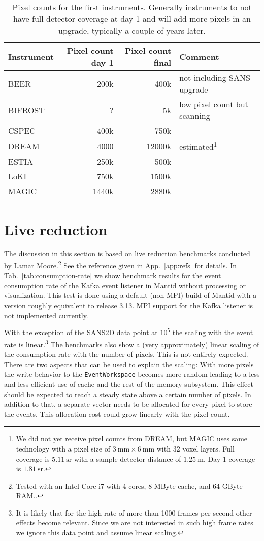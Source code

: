 \documentclass[a4paper,english,numbers=noenddot,bibliography=totoc,chapterprefix=on,DIV=12]{scrartcl}
\newcommand{\beer}{BEER\xspace}
\newcommand{\bifrost}{BIFROST\xspace}
\newcommand{\cspec}{CSPEC\xspace}
\newcommand{\dream}{DREAM\xspace}
\newcommand{\estia}{ESTIA\xspace}
\newcommand{\loki}{LoKI\xspace}
\newcommand{\magic}{MAGIC\xspace}
\newcommand{\mantid}{Mantid\xspace}
\begin{document}
\begin{table}
  \centering
  \begin{tabular}{lrrl}
    Instrument & Pixel count day 1 & Pixel count final & Comment\\
    \hline
    \beer & 200k & 400k & not including SANS upgrade\\
    \bifrost & ? & 5k & low pixel count but scanning\\
    \cspec & 400k & 750k \\
    \dream & 4000 & 12000k & estimated\footnote{We did not yet receive pixel counts from DREAM, but MAGIC uses same technology with a pixel size of $3~\mathrm{mm} \times 6~\mathrm{mm}$ with 32 voxel layers. Full coverage is $5.11~\mathrm{sr}$ with a sample-detector distance of $1.25~\mathrm{m}$. Day-1 coverage is $1.81~\mathrm{sr}$.}\\
    \estia & 250k & 500k \\
    \loki & 750k & 1500k \\
    \magic & 1440k & 2880k \\
  \end{tabular}
  \caption{\label{tab:pixel-counts}Pixel counts for the first instruments. Generally instruments to not have full detector coverage at day 1 and will add more pixels in an upgrade, typically a couple of years later.}
\end{table}




\section{Live reduction}

The discussion in this section is based on live reduction benchmarks conducted by Lamar Moore.\footnote{Tested with an Intel Core i7 with 4 cores, 8 MByte cache, and 64 GByte RAM..}
See the reference given in App.~\ref{app:refs} for details.
In Tab.~\ref{tab:consumption-rate} we show benchmark results for the event consumption rate of the Kafka event listener in \mantid without processing or visualization.
This test is done using a default (non-MPI) build of \mantid with a version roughly equivalent to release 3.13.
MPI support for the Kafka listener is not implemented currently.

With the exception of the SANS2D data point at $10^5$ the scaling with the event rate is linear.\footnote{It is likely that for the high rate of more than 1000 frames per second other effects become relevant. Since we are not interested in such high frame rates we ignore this data point and assume linear scaling.}
The benchmarks also show a (very approximately) linear scaling of the consumption rate with the number of pixels.
This is not entirely expected.
There are two aspects that can be used to explain the scaling:
With more pixels the write behavior to the \verb|EventWorkspace| becomes more random leading to a less and less efficient use of cache and the rest of the memory subsystem.
This effect should be expected to reach a steady state above a certain number of pixels.
In addition to that, a separate vector needs to be allocated for every pixel to store the events.
This allocation cost could grow linearly with the pixel count.
\end{document}
